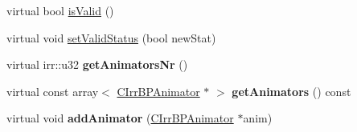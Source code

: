 \begin{DoxyCompactItemize}
\item 
virtual bool \hyperlink{class_c_irr_b_p_rigid_body_a7cf1fec31be0dd1519f0eb85c5df7426}{isValid} ()
\item 
virtual void \hyperlink{class_c_irr_b_p_rigid_body_ac95ba035b7a81013d1aebf7511528047}{setValidStatus} (bool newStat)
\item 
\hypertarget{class_c_irr_b_p_rigid_body_a2183125d6e49e97403bbef196b71dc47}{
virtual irr::u32 {\bfseries getAnimatorsNr} ()}
\label{class_c_irr_b_p_rigid_body_a2183125d6e49e97403bbef196b71dc47}

\item 
\hypertarget{class_c_irr_b_p_rigid_body_a2556282d3d8b57607b08beb1ea9f80ad}{
virtual const array$<$ \hyperlink{class_c_irr_b_p_animator}{CIrrBPAnimator} $\ast$ $>$ {\bfseries getAnimators} () const }
\label{class_c_irr_b_p_rigid_body_a2556282d3d8b57607b08beb1ea9f80ad}

\item 
\hypertarget{class_c_irr_b_p_rigid_body_a3f424e92b4ae1d243b1cf5691e35110b}{
virtual void {\bfseries addAnimator} (\hyperlink{class_c_irr_b_p_animator}{CIrrBPAnimator} $\ast$anim)}
\label{class_c_irr_b_p_rigid_body_a3f424e92b4ae1d243b1cf5691e35110b}

\end{DoxyCompactItemize}
